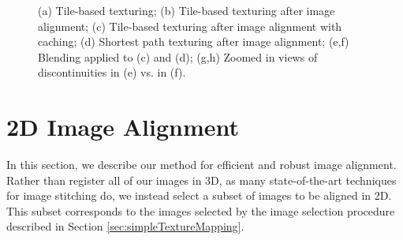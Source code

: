 \documentclass[]{spie}  %
\begin{document}
\begin{figure}
  \centering {}

  \caption{(a) Tile-based texturing; (b) Tile-based texturing after
    image alignment; (c) Tile-based texturing after image alignment
    with caching; (d) Shortest path texturing after image
    alignment; (e,f) Blending applied to (c) and (d); (g,h) Zoomed
    in views of discontinuities in (e) vs. in (f).}
  \label{fig:compareAll}
\end{figure}


\section{2D Image Alignment}
\label{sec:2dAlignment}
In this section, we describe our method for efficient and robust image
alignment. Rather than register all of our images in 3D, as many
state-of-the-art techniques for image stitching do, we instead select
a subset of images to be aligned in 2D. This subset corresponds to the
images selected by the image selection procedure described in Section
\ref{sec:simpleTextureMapping}.
\end{document}
